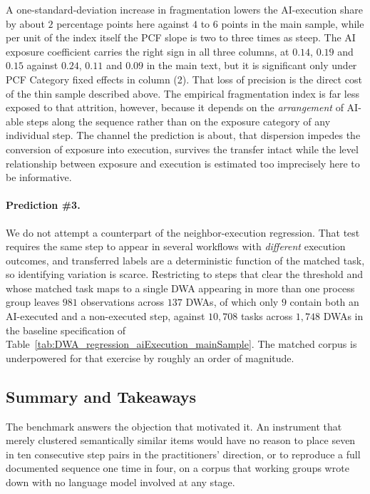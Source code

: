 A one-standard-deviation increase in fragmentation lowers the AI-execution share by about $2$ percentage
points here against $4$ to $6$ points in the main sample, while per unit of the index itself the PCF slope is
two to three times as steep.
The AI exposure coefficient carries the right sign in all three columns, at $0.14$, $0.19$ and $0.15$ against
$0.24$, $0.11$ and $0.09$ in the main text, but it is significant only under PCF Category fixed effects in column (2).
That loss of precision is the direct cost of the thin sample described above.
The empirical fragmentation index is far less exposed to that attrition, however, because it depends on the \emph{arrangement} of AI-able steps along the sequence rather than on the exposure category of any individual step.
The channel the prediction is about, that dispersion impedes the conversion of exposure into execution,
survives the transfer intact while the level relationship between exposure and execution is estimated too imprecisely here to be informative.

\paragraph{Prediction \#3.}
We do not attempt a counterpart of the neighbor-execution regression.
That test requires the same step to appear in several workflows with \emph{different} execution outcomes, and
transferred labels are a deterministic function of the matched task, so identifying variation is scarce.
Restricting to steps that clear the threshold and whose matched task maps to a single DWA appearing in more
than one process group leaves $981$ observations across $137$ DWAs, of which only $9$ contain both an
AI-executed and a non-executed step, against $10{,}708$ tasks across $1{,}748$ DWAs in the baseline specification of
Table~\ref{tab:DWA_regression_aiExecution_mainSample}.
The matched corpus is underpowered for that exercise by roughly an order of magnitude.

\subsection{Summary and Takeaways}
\label{app:external_validation_discussion}

The benchmark answers the objection that motivated it.
An instrument that merely clustered semantically similar items would have no reason to place seven in ten
consecutive step pairs in the practitioners' direction, or to reproduce a full documented sequence one time in
four, on a corpus that working groups wrote down with no language model involved at any stage.

